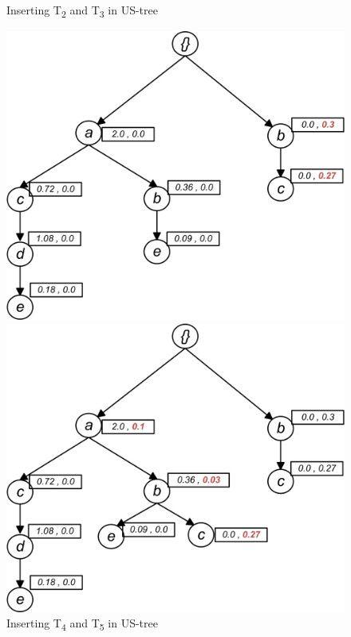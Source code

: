 \begin{figure}
\begin{minipage}{0.40\textwidth}
\end{minipage}
 \caption{Inserting T\textsubscript{2} and T\textsubscript{3} in US-tree}
 \label{figure:t23}
\end{figure}

\begin{figure}
\begin{minipage}{0.50\textwidth}
  \centering
  \includegraphics[width=\textwidth]{images/sim_04.jpg}
\end{minipage}
\hfill
\begin{minipage}{0.50\textwidth}
  \centering
  \includegraphics[width=\textwidth]{images/sim_05.jpg}
\end{minipage}
\caption{Inserting T\textsubscript{4} and T\textsubscript{5} in US-tree}
 \label{figure:t456}
\end{figure}


